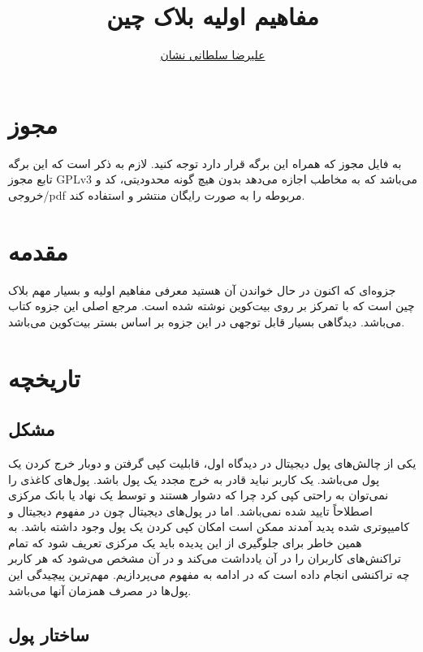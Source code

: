 \documentclass[10pt, a4paper]{article}
\title{مفاهیم اولیه بلاک چین}
\author{\href{mailto:a.soltani@iau-tnb.ac.ir}{علیرضا سلطانی نشان}}
\begin{document}
\maketitle
\tableofcontents

\section{مجوز}

به فایل مجوز که همراه این برگه قرار دارد توجه کنید. لازم به ذکر است که این برگه
تابع مجوز GPLv3 می‌باشد که به مخاطب اجازه می‌دهد بدون هیچ گونه محدودیتی، کد و
خروجی/pdf مربوطه را به صورت رایگان منتشر و استفاده کند.

\section{مقدمه}

جزوه‌ای که اکنون در حال خواندن آن هستید معرفی مفاهیم اولیه و بسیار مهم بلاک چین
است که با تمرکز بر روی بیت‌کوین نوشته شده است. مرجع اصلی این جزوه کتاب
 می‌باشد. دیدگاهی بسیار قابل توجهی
در این جزوه بر اساس بستر بیت‌کوین می‌باشد.

\section{تاریخچه}

\subsection{مشکل }

یکی از چالش‌های پول دیجیتال در دیدگاه اول، قابلیت کپی گرفتن و دوبار خرج کردن یک
پول می‌باشد. یک کاربر نباید قادر به خرج مجدد یک پول باشد. پول‌های کاغذی را
نمی‌توان به راحتی کپی کرد چرا که دشوار هستند و توسط یک نهاد یا بانک مرکزی
اصطلاحاً تایید شده نمی‌باشد. اما در پول‌های دیجیتال چون در مفهوم دیجیتال و
کامیپوتری شده پدید آمدند ممکن است امکان کپی کردن یک پول وجود داشته باشد. به همین
خاطر برای جلوگیری از این پدیده باید یک مرکزی تعریف شود که تمام تراکنش‌های
کاربران را در آن یادداشت می‌کند و در آن مشخص می‌شود که هر کاربر چه تراکنشی انجام
داده است که در ادامه به مفهوم  می‌پردازیم. مهم‌ترین پیچیدگی این
پول‌ها در مصرف همزمان آنها می‌باشد.

\subsection{ساختار پول}
\end{document}

